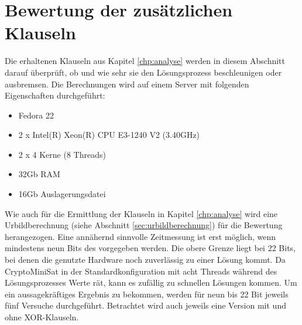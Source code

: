 \chapter{Bewertung der zusätzlichen Klauseln}
\label{chp:bewertung}

Die erhaltenen Klauseln aus Kapitel \ref{chp:analyse} werden in diesem Abschnitt darauf überprüft,
ob und wie sehr sie den Lösungsprozess beschleunigen oder ausbremsen. Die Berechnungen wird auf einem
Server mit folgenden Eigenschaften durchgeführt:
\begin{itemize}
  \item Fedora 22
  \item 2 x Intel(R) Xeon(R) CPU E3-1240 V2 (3.40GHz)
  \item 2 x 4 Kerne (8 Threads)
  \item 32Gb RAM
  \item 16Gb Auslagerungsdatei
\end{itemize}

Wie auch für die Ermittlung der Klauseln in Kapitel \ref{chp:analyse} wird eine Urbildberechnung (siehe Abschnitt \ref{sec:urbildberechnung})
für die Bewertung herangezogen. Eine annähernd sinnvolle Zeitmessung ist erst möglich, wenn mindestens neun Bits des  vorgegeben werden.
Die obere Grenze liegt bei 22 Bits, bei denen die genutzte Hardware noch zuverlässig zu einer Lösung kommt. Da CryptoMiniSat in der Standardkonfiguration
mit acht Threads während des Lösungsprozesses Werte rät, kann es zufällig zu schnellen Lösungen kommen. Um ein aussagekräftiges Ergebnis
zu bekommen, werden für neun bis 22 Bit jeweils fünf Versuche durchgeführt. Betrachtet wird auch jeweils eine Version mit und ohne XOR-Klauseln.

